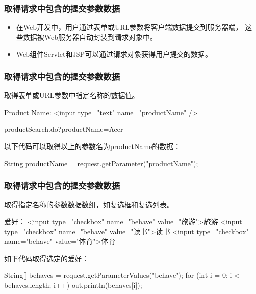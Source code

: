 \begin{frame} %
  \frametitle{取得请求中包含的提交参数数据} 

  \begin{itemize}
  \item 在Web开发中，用户通过表单或URL参数将客户端数据提交到服务器端，
    这些数据被Web服务器自动封装到请求对象中。
  \item Web组件Servlet和JSP可以通过请求对象获得用户提交的数据。
  \end{itemize}
\end{frame}

\begin{frame} %
  \frametitle{取得请求中包含的提交参数数据} 
  
   取得表单或URL参数中指定名称的数据值。


  \begin{xmlCode}
    Product Name: <input type="text" name="productName" />
  \end{xmlCode}

  
  \begin{xmlCode}
    productSearch.do?productName=Acer    
  \end{xmlCode}

  以下代码可以取得以上的参数名为productName的数据：
  
  \begin{javaCode}
    String productName = request.getParameter("productName");
  \end{javaCode}
\end{frame}

\begin{frame} %
  \frametitle{取得请求中包含的提交参数数据} 

   取得指定名称的参数数据数组，如复选框和复选列表。

  
  \begin{xmlCode}
    爱好：
    <input type="checkbox" name="behave" value="旅游">旅游
    <input type="checkbox" name="behave" value="读书">读书
    <input type="checkbox" name="behave" value="体育">体育
  \end{xmlCode}

  如下代码取得选定的爱好：

  \begin{javaCode}
    String[] behaves = request.getParameterValues("behave");
    for (int i = 0; i < behaves.length; i++) {
      out.println(behaves[i]);
    }
  \end{javaCode}
\end{frame}

